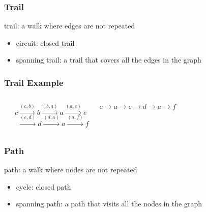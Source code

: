 \documentclass[dvipsnames]{beamer}
\begin{document}
\begin{frame}
  \frametitle{Trail}

  \begin{definition}
    \alert{trail}: a walk where edges are not repeated
  \end{definition}

  \begin{itemize}
    \item \alert{circuit}: closed trail
    \item \alert{spanning} trail: a trail that covers all the edges in the
      graph
  \end{itemize}
\end{frame}

\begin{frame}
  \frametitle{Trail Example}

  \begin{example}
    \begin{columns}
      \begin{center}
      \end{center}

      $c \xrightarrow{(c,b)} b \xrightarrow{(b,a)} a \xrightarrow{(a,e)} e$\\
      $~~\xrightarrow{(e,d)} d \xrightarrow{(d,a)} a \xrightarrow{(a,f)} f$

      \medskip
      $c \rightarrow a \rightarrow e \rightarrow d \rightarrow a
         \rightarrow f$
    \end{columns}
  \end{example}
\end{frame}

\begin{frame}
  \frametitle{Path}

  \begin{definition}
    \alert{path}: a walk where nodes are not repeated
  \end{definition}

  \begin{itemize}
    \item \alert{cycle}: closed path
    \item \alert{spanning} path: a path that visits all the nodes in the graph
  \end{itemize}
\end{frame}
\end{document}
